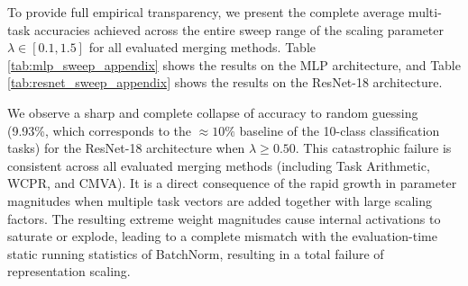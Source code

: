 \documentclass{article}
\theoremstyle{plain}
\theoremstyle{definition}
\theoremstyle{remark}
\begin{document}
To provide full empirical transparency, we present the complete average multi-task accuracies achieved across the entire sweep range of the scaling parameter $\lambda \in [0.1, 1.5]$ for all evaluated merging methods. Table \ref{tab:mlp_sweep_appendix} shows the results on the MLP architecture, and Table \ref{tab:resnet_sweep_appendix} shows the results on the ResNet-18 architecture.

We observe a sharp and complete collapse of accuracy to random guessing (9.93\%, which corresponds to the $\approx 10\%$ baseline of the 10-class classification tasks) for the ResNet-18 architecture when $\lambda \ge 0.50$. This catastrophic failure is consistent across all evaluated merging methods (including Task Arithmetic, WCPR, and CMVA). It is a direct consequence of the rapid growth in parameter magnitudes when multiple task vectors are added together with large scaling factors. The resulting extreme weight magnitudes cause internal activations to saturate or explode, leading to a complete mismatch with the evaluation-time static running statistics of BatchNorm, resulting in a total failure of representation scaling.
\end{document}
